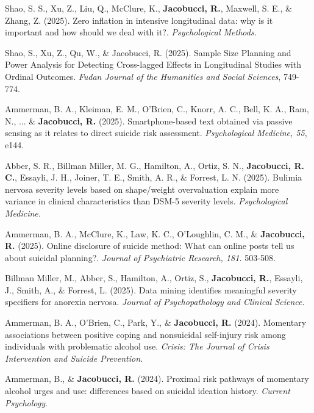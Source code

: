 \documentclass[letterpaper,10pt]{article}
\begin{document}
\begin{etaremune}
	\item Shao, S. S., Xu, Z., Liu, Q., McClure, K., \textbf{Jacobucci, R.}, Maxwell, S. E., \& Zhang, Z. (2025). Zero inflation in intensive longitudinal data: why is it important and how should we deal with it?. \emph{Psychological Methods.}
	
	
	\item Shao, S., Xu, Z., Qu, W., \& Jacobucci, R. (2025). Sample Size Planning and Power Analysis for Detecting Cross-lagged Effects in Longitudinal Studies with Ordinal Outcomes. \emph{Fudan Journal of the Humanities and Social Sciences}, 749-774.
	
	
	\item Ammerman, B. A., Kleiman, E. M., O’Brien, C., Knorr, A. C., Bell, K. A., Ram, N., ... \& \textbf{Jacobucci, R.} (2025). Smartphone-based text obtained via passive sensing as it relates to direct suicide risk assessment. \emph{Psychological Medicine, 55}, e144.
	
	
	\item Abber, S. R., Billman Miller, M. G., Hamilton, A., Ortiz, S. N., \textbf{Jacobucci, R. C.}, Essayli, J. H., Joiner, T. E., Smith, A. R., \& Forrest, L. N.  (2025). Bulimia nervosa severity levels based on shape/weight overvaluation explain more variance in clinical characteristics than DSM-5 severity levels. \emph{Psychological Medicine.}
	
	\item Ammerman, B. A., McClure, K., Law, K. C., O’Loughlin, C. M., \& \textbf{Jacobucci, R.} (2025). Online disclosure of suicide method: What can online posts tell us about suicidal planning?. \emph{Journal of Psychiatric Research, 181.} 503-508.
	
			\item Billman Miller, M., Abber, S., Hamilton, A., Ortiz, S., \textbf{Jacobucci, R.}, Essayli, J., Smith, A., \& Forrest, L. (2025). Data mining identifies meaningful severity specifiers for anorexia nervosa. \emph{Journal of Psychopathology and Clinical Science.} 
	
	\item Ammerman, B. A., O'Brien, C., Park, Y., \& \textbf{Jacobucci, R.} (2024). Momentary associations between positive coping and nonsuicidal self-injury risk among individuals with problematic alcohol use. \emph{Crisis: The Journal of Crisis Intervention and Suicide Prevention.}
	
	
		\item Ammerman, B., \&  \textbf{Jacobucci, R.} (2024). Proximal risk pathways of momentary alcohol urges and use: differences based on suicidal ideation history. \emph{Current Psychology}.
	

\end{etaremune}
\end{document}
